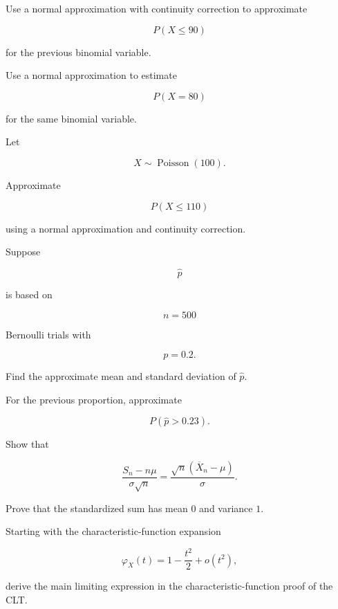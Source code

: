 \begin{exercise}[2]
Use a normal approximation with continuity correction to approximate

\[
P(X\leq90)
\]

for the previous binomial variable.
\end{exercise}

\begin{exercise}[2]
Use a normal approximation to estimate

\[
P(X=80)
\]

for the same binomial variable.
\end{exercise}

\begin{exercise}[2]
Let

\[
X\sim\operatorname{Poisson}(100).
\]

Approximate

\[
P(X\leq110)
\]

using a normal approximation and continuity correction.
\end{exercise}

\begin{exercise}[2]
Suppose

\[
\widehat{p}
\]

is based on

\[
n=500
\]

Bernoulli trials with

\[
p=0.2.
\]

Find the approximate mean and standard deviation of \(\widehat{p}\).
\end{exercise}

\begin{exercise}[2]
For the previous proportion, approximate

\[
P(\widehat{p}>0.23).
\]
\end{exercise}

\begin{exercise}[3]
Show that

\[
\frac{
S_n-n\mu
}{
\sigma\sqrt{n}
}
=
\frac{
\sqrt{n}
(\overline{X}_n-\mu)
}{
\sigma
}.
\]
\end{exercise}

\begin{exercise}[3]
Prove that the standardized sum has mean \(0\) and variance \(1\).
\end{exercise}

\begin{exercise}[3]
Starting with the characteristic-function expansion

\[
\varphi_X(t)
=
1-\frac{t^2}{2}+o(t^2),
\]

derive the main limiting expression in the characteristic-function
proof of the CLT.
\end{exercise}

